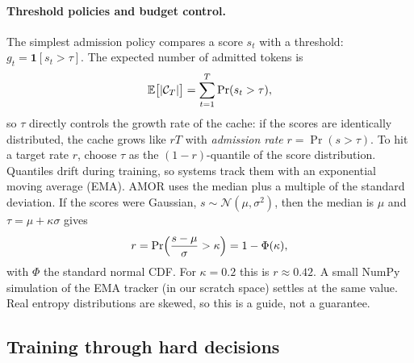 \paragraph{Threshold policies and budget control.} The simplest admission policy compares a score
$s_t$ with a threshold: $g_t=\mathbf{1}[s_t>\tau]$. The expected number of admitted tokens is
\begin{equation}\label{eq:c13-expected-cache}
  \mathbb{E}\bigl[\left\lvert \mathcal{C}_T\right\rvert\bigr] = \sum_{t=1}^{T}\Pr(s_t>\tau),
\end{equation}
so $\tau$ directly controls the growth rate of the cache: if the scores are identically distributed,
the cache grows like $rT$ with \emph{admission rate} $r=\Pr(s>\tau)$. To hit a target rate $r$, choose
$\tau$ as the $(1-r)$-quantile of the score distribution. Quantiles drift during training, so systems
track them with an exponential moving average (EMA). AMOR uses the median plus a multiple of the
standard deviation. If the scores were Gaussian, $s\sim\mathcal{N}(\mu,\sigma^2)$, then the median is
$\mu$ and $\tau=\mu+\kappa\sigma$ gives
\begin{equation}\label{eq:c13-fire-rate}
  r = \Pr\Bigl(\frac{s-\mu}{\sigma}>\kappa\Bigr) = 1-\Phi(\kappa),
\end{equation}
with $\Phi$ the standard normal CDF. For $\kappa=0.2$ this is $r\approx 0.42$. A small NumPy
simulation of the EMA tracker (in our scratch space) settles at the same value. Real entropy
distributions are skewed, so this is a guide, not a guarantee.

\subsection{Training through hard decisions}\label{sec:c13-hard}

